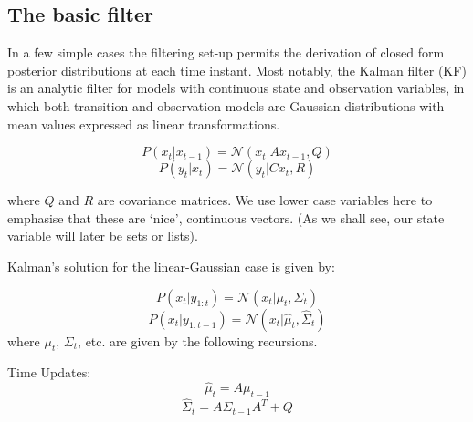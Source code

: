 \subsection{The basic filter}

In a few simple cases the filtering set-up permits the derivation of closed form posterior distributions at each time instant. Most notably, the Kalman filter (KF) \cite{Kalman1960} is an analytic filter for models with continuous state and observation variables, in which both transition and observation models are Gaussian distributions with mean values expressed as linear transformations.

\begin{equation}
P(x_t|x_{t-1}) = \mathcal{N}(x_t|Ax_{t-1}, Q)
\label{eq:LinearFilterEq1}
\end{equation}
\begin{equation}
P(y_t|x_t) = \mathcal{N}(y_t|C x_t, R)
\label{eq:LinearFilterEq2}
\end{equation}



where $Q$ and $R$ are covariance matrices. We use lower case variables here to emphasise that these are `nice', continuous vectors. (As we shall see, our state variable will later be sets or lists).

Kalman's solution for the linear-Gaussian case is given by:

\begin{equation}
P(x_t|y_{1:t}) = \mathcal{N}(x_t|\mu_t, \Sigma_t )
\label{eq:KF}
\end{equation}
\begin{equation}
P(x_t|y_{1:t-1}) = \mathcal{N}(x_t|\hat{\mu}_t, \hat{\Sigma}_t )
\label{eq:KFp}
\end{equation}
where $\mu_t$, $\Sigma_t$, etc. are given by the following recursions.

Time Updates:
\begin{equation}
\hat{\mu}_t = A \mu_{t-1}
\label{eq:KFTime1}
\end{equation}
\begin{equation}
\hat{\Sigma}_t = A \Sigma_{t-1} A^{T} + Q
\label{eq:KFTime2}
\end{equation}

